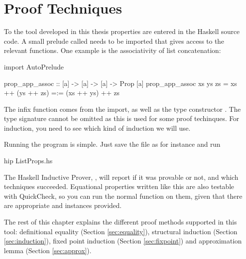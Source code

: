 \chapter{Proof Techniques}
\label{ch:proofs}

To the tool developed in this thesis properties are entered in the
Haskell source code. A small prelude called  needs to
be imported that gives access to the relevant functions. One example
is the associativity of list concatenation:

\begin{code}
import AutoPrelude

prop_app_assoc :: [a] -> [a] -> [a] -> Prop [a]
prop_app_assoc xs ys zs = xs ++ (ys ++ zs) =:= (xs ++ ys) ++ zs
\end{code}

The infix function \hs{=:=} comes from the import, as well as the type
constructor . The type signature cannot be omitted as this is
used for some proof techinques. For induction, you need to see which
kind of induction we will use.

Running the program is simple. Just save the file as for instance
 and run

\begin{code}
hip ListProps.hs
\end{code}

\noindent
The Haskell Inductive Prover, , will report if it was provable
or not, and which techniques succeeded. Equational properties written
like this are also testable with QuickCheck, so you can run the normal
 function on them, given that there are appropriate
 and  instances provided.

The rest of this chapter explains the different proof methods
supported in this tool: definitional equality (Section
\ref{sec:equality}), structural induction (Section
\ref{sec:induction}), fixed point induction (Section
\ref{sec:fixpoint}) and approximation lemma (Section
\ref{sec:approx}).










